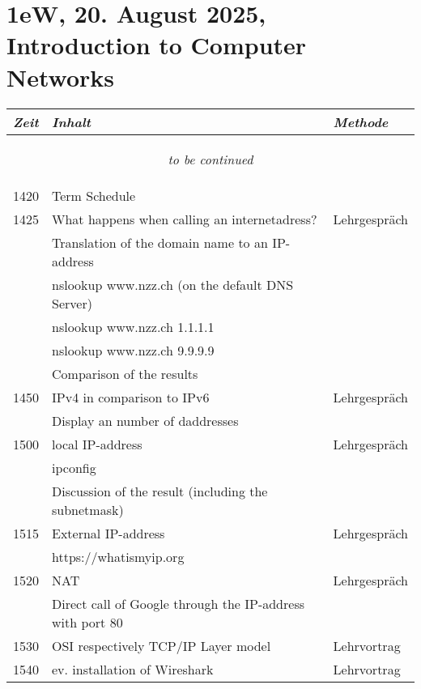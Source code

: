 \documentclass[a4paper]{scrreprt}
\begin{document}
\section*{1eW, 20. August 2025, Introduction to Computer Networks}
\begin{longtable}{p{1.5cm}>{\RaggedRight}p{7.5cm}p{2.5cm}}
    \toprule
    \emph{Zeit}&\emph{Inhalt}&\emph{Methode}\\
    \midrule
    \endhead

    \midrule
    \multicolumn{3}{c}{\begin{tiny}\textit{to be continued}\end{tiny}}\\
    \midrule
    \endfoot

    \bottomrule
    \endlastfoot

    1420&Term Schedule&\\ [5pt]

    1425&What happens when calling an internetadress?&Lehrgespräch\\
        &Translation of the domain name to an IP-address&\\
        &nslookup www.nzz.ch (on the default DNS Server)&\\
        &nslookup www.nzz.ch 1.1.1.1&\\
        &nslookup www.nzz.ch 9.9.9.9&\\
        &Comparison of the results&\\ [5pt]

    1450&IPv4 in comparison to IPv6&Lehrgespräch\\
        &Display an number of daddresses&\\ [5pt]

    1500&local IP-address&Lehrgespräch\\
        &ipconfig&\\
        &Discussion of the result (including the subnetmask)&\\ [5pt]

    1515&External IP-address&Lehrgespräch\\
        &https://whatismyip.org&\\ [5pt]

    1520&NAT&Lehrgespräch\\ [5pt]
        &Direct call of Google through the IP-address with port 80&\\ [5pt]

    1530&OSI respectively TCP/IP Layer model&Lehrvortrag\\ [5pt]

    1540&ev. installation of Wireshark&Lehrvortrag\\




\end{longtable}
\end{document}
